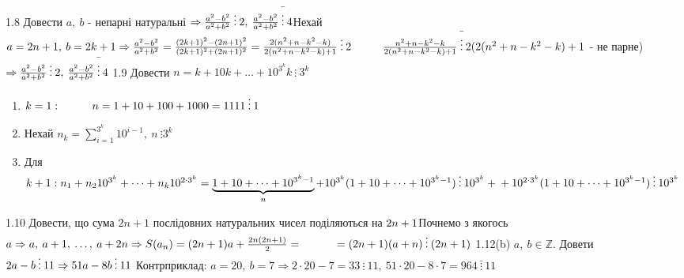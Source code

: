 \documentclass[a4paper,12pt]{article}
\newcommand\tab[1][1cm]{\hspace*{#1}}
\begin{document}
1.8 Довести $a,\>b$ - непарні натуральні $\Rightarrow \frac {a^2-b^2}{a^2+b^2}\>\vdots\>2,\>\frac {a^2-b^2}{a^2+b^2}\>\bar{\vdots}\>4\\$\tab Нехай $a=2n+1,\>b=2k+1\Rightarrow \frac {a^2-b^2}{a^2+b^2}=\frac{(2k+1)^2-(2n+1)^2}{(2k+1)^2+(2n+1)^2}=\frac{2(n^2+n-k^2-k)}{2(n^2+n-k^2-k)+1}\>\vdots\>2\\\tab\frac{n^2+n-k^2-k}{2(n^2+n-k^2-k)+1}\>\bar{\vdots}\>2(2(n^2+n-k^2-k)+1$ - не парне)$\Rightarrow \frac {a^2-b^2}{a^2+b^2}\>\vdots\>2,\>\frac {a^2-b^2}{a^2+b^2}\>\bar{\vdots}\>4\\$
1.9  Довести $n=k+10k+\dots+10^{3^k}k\>\vdots\>3^k$
\begin{enumerate}
	\item $k=1:\tab n=1+10+100+1000=1111\>\vdots\>1$
	\item Нехай $n_k=\sum\limits_{i=1}^{3^k}10^{i-1},\>n\>\vdots 3^k$
	\item Для $k+1:\\n_1+n_210^{3^k}+\dots+n_k10^{2\cdot3^k}=\underbrace{1+10+\dots+10^{3^k-1}}_{n}+10^{3^k}(1+10+\dots+10^{3^k-1})\>\vdots\>10^{3^k}+\\+10^{2\cdot3^k}(1+10+\dots+10^{3^k-1})\>\vdots\>10^{3^k}$
\end{enumerate}
1.10 Довести, що сума $2n+1$ послідовних натуральних чисел поділяються на $2n+1\\$\tab Почнемо з якогось $a\Rightarrow a,\>a+1,\>\dots,\>a+2n\Rightarrow S(a_n)=(2n+1)a+\frac{2n(2n+1)}{2}=\\\tab=(2n+1)(a+n)\>\vdots\>(2n+1)\\$
1.12(b) $a,\>b\in\mathbb{Z}.$ Довети $2a-b\>\vdots\>11\Rightarrow51a-8b\>\vdots\>11\\$  Контрприклад: $a=20,\>b=7\Rightarrow2\cdot 20-7=33\>\vdots\>11,\>51\cdot 20-8\cdot 7=964\>\bar{\vdots}\>11$
\end{document}
